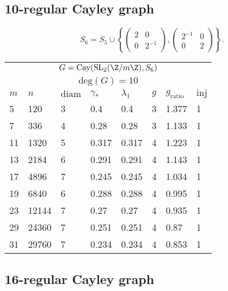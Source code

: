 \newpage

\subsection{10-regular Cayley graph}


$$S_6 =  S_5 \cup  \left\{ \begin{pmatrix}
2 & 0 \\ 0 & 2^{-1}
\end{pmatrix}, \begin{pmatrix}
2^{-1} & 0 \\  0 & 2 
\end{pmatrix} \right\}.$$

\vspace{2em}

\begin{center}
	\begin{tabular}{ p{1cm}|p{1cm}|p{1cm}|p{1cm}|p{1cm}|p{1cm}|p{1cm}|p{1cm} }
		\multicolumn{8}{c}{$G = \mathrm{Cay}(\mathrm{SL}_2(\Z/m\Z),S_6)$} \\
		\multicolumn{8}{c}{$\mathrm{deg}(G) = 10$} \\
		\hline
		$m$ & $n$ &  $\mathrm{diam}$ & $\gamma_*$ &  $\lambda_1$ & $g$ & $g_{\mathrm{ratio}}$ & $\mathrm{inj}$     \\
		\hline
		5 & 120 & 3 &  0.4 & 0.4 & 3 & 1.377 & 1 \\
		7 & 336 & 4 &  0.28 & 0.28 & 3 & 1.133 & 1 \\
		11 & 1320 & 5 &  0.317 & 0.317 & 4 & 1.223 & 1 \\
		13 & 2184 & 6 &  0.291 & 0.291 & 4 & 1.143 & 1 \\
		17 & 4896 & 7 &  0.245 & 0.245 & 4 & 1.034 & 1 \\
		19 & 6840 & 6 &  0.288 & 0.288 & 4 & 0.995 & 1 \\
		23 & 12144 & 7 &  0.27 & 0.27 & 4 & 0.935 & 1 \\
		29 & 24360 & 7 &  0.251 & 0.251 & 4 & 0.87 & 1 \\
		31 & 29760 & 7 &  0.234 & 0.234 & 4 & 0.853 & 1 
	\end{tabular}
\end{center}


\newpage 

\subsection{16-regular Cayley graph}

